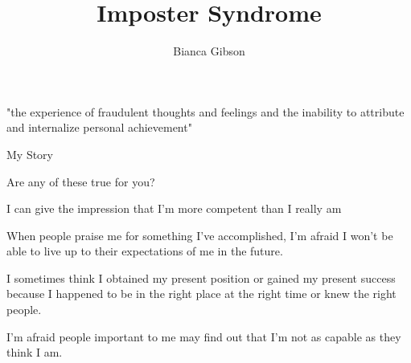 \documentclass[aspectratio=169]{beamer}
\title{Imposter Syndrome}
\author{Bianca Gibson}
\institute{Pycon AU 2016}
\date{}
\begin{document}
\frame{\titlepage}

\begin{frame}
  \begin{center}
    \Huge "the experience of fraudulent thoughts and feelings and the inability to attribute and internalize personal achievement"
    \cite{hh15}
  \end{center}
\end{frame}

\begin{frame}
  \begin{center}
    \Huge My Story
  \end{center}
\end{frame}

\begin{frame}
  \begin{center}
    \Huge Are any of these true for you?
  \end{center}
\end{frame}

\begin{frame}
  \begin{center}
    \Huge  I can give the impression that I’m more competent than I really am
  \end{center}
\end{frame}

\begin{frame}
  \begin{center}
    \Huge  When  people  praise  me  for  something  I’ve  accomplished,  I’m  afraid  I  won’t  be able to live up to their expectations of me in the future.
  \end{center}
\end{frame}

\begin{frame}
  \begin{center}
    \Huge  I sometimes think I obtained my present position or gained my present success because I happened to be in the right
    place at the right time or knew the right people.
  \end{center}
\end{frame}

\begin{frame}
  \begin{center}
    \Huge  I’m  afraid  people  important  to  me  may  find  out  that  I’m  not  as  capable  as  they  think  I  am.
  \end{center}
\end{frame}
\end{document}

